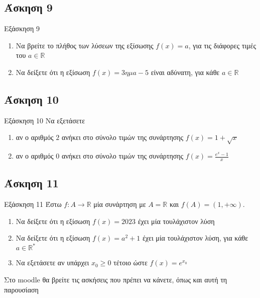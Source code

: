 \documentclass[greek]{beamer}
\begin{document}
\subsection{Άσκηση 9}
\begin{frame}[label=Άσκηση9,t]{Εξάσκηση 9}
      \href{https://www.geogebra.org/m/dvzdm7bw}{}
      \begin{enumerate}
            \item<1-> Να βρείτε το πλήθος των λύσεων της εξίσωσης $f(x)=a$, για τις διάφορες τιμές του $a\in\mathbb{R}$
            \item<2-> Να δείξετε ότι η εξίσωση $f(x)=3ημ a - 5$ είναι αδύνατη, για κάθε $a\in\mathbb{R}$
      \end{enumerate}
\end{frame}

\subsection{Άσκηση 10}
\begin{frame}[label=Άσκηση10,t]{Εξάσκηση 10}
      Να εξετάσετε
      \begin{enumerate}
            \item<1-> αν ο αριθμός $2$ ανήκει στο σύνολο τιμών της συνάρτησης $f(x)=1+\sqrt{x}$
            \item<2-> αν ο αριθμός $0$ ανήκει στο σύνολο τιμών της συνάρτησης $f(x)=\frac{e^x-1}{x}$
      \end{enumerate}
\end{frame}

\subsection{Άσκηση 11}
\begin{frame}[label=Άσκηση11,t]{Εξάσκηση 11}
      Έστω $f:A\to\mathbb{R}$ μία συνάρτηση με $A=\mathbb{R}$ και $f(A)=(1,+\infty)$.
      \begin{enumerate}
            \item<1-> Να δείξετε ότι η εξίσωση $f(x)=2023$ έχει μία τουλάχιστον λύση
            \item<2-> Να δείξετε ότι η εξίσωση $f(x)=a^2+1$ έχει μία τουλάχιστον λύση, για κάθε $a\in\mathbb{R^*}$
            \item<3-> Να εξετάσετε αν υπάρχει $x_0\ge 0$ τέτοιο ώστε $f(x)=e^{x_0}$
      \end{enumerate}
\end{frame}

\begin{frame}
      Στο moodle θα βρείτε τις ασκήσεις που πρέπει να κάνετε, όπως και αυτή τη παρουσίαση
\end{frame}
\end{document}
